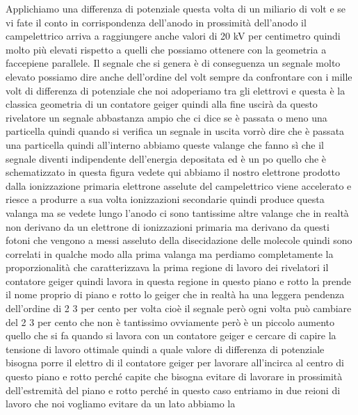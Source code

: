 {Applichiamo una differenza di potenziale questa volta di un miliario di volt e se vi fate il conto in corrispondenza dell'anodo in prossimità dell'anodo il campelettrico arriva a raggiungere anche valori di 20 kV per centimetro quindi molto più elevati rispetto a quelli che possiamo ottenere con la geometria a faccepiene parallele. Il segnale che si genera è di conseguenza un segnale molto elevato possiamo dire anche dell'ordine del volt sempre da confrontare con i mille volt di differenza di potenziale che noi adoperiamo tra gli elettrovi e questa è la classica geometria di un contatore geiger quindi alla fine uscirà da questo rivelatore un segnale abbastanza ampio che ci dice se è passata o meno una particella quindi quando si verifica un segnale in uscita vorrò dire che è passata una particella quindi all'interno abbiamo queste valange che fanno sì che il segnale diventi indipendente dell'energia depositata ed è un po quello che è schematizzato in questa figura vedete qui abbiamo il nostro elettrone prodotto dalla ionizzazione primaria elettrone asselute del campelettrico viene accelerato e riesce a produrre a sua volta ionizzazioni secondarie quindi produce questa valanga ma se vedete lungo l'anodo ci sono tantissime altre valange che in realtà non derivano da un elettrone di ionizzazioni primaria ma derivano da questi fotoni che vengono a messi asseluto della disecidazione delle molecole quindi sono correlati in qualche modo alla prima valanga ma perdiamo completamente la proporzionalità che caratterizzava la prima regione di lavoro dei rivelatori il contatore geiger quindi lavora in questa regione in questo piano e rotto la prende il nome proprio di piano e rotto lo geiger che in realtà ha una leggera pendenza dell'ordine di 2 3 per cento per volta cioè il segnale però ogni volta può cambiare del 2 3 per cento che non è tantissimo ovviamente però è un piccolo aumento quello che si fa quando si lavora con un contatore geiger e cercare di capire la tensione di lavoro ottimale quindi a quale valore di differenza di potenziale bisogna porre il elettro di il contatore geiger per lavorare all'incirca al centro di questo piano e rotto perché capite che bisogna evitare di lavorare in prossimità dell'estremità del piano e rotto perché in questo caso entriamo in due reioni di lavoro che noi vogliamo evitare da un lato abbiamo la 

}
